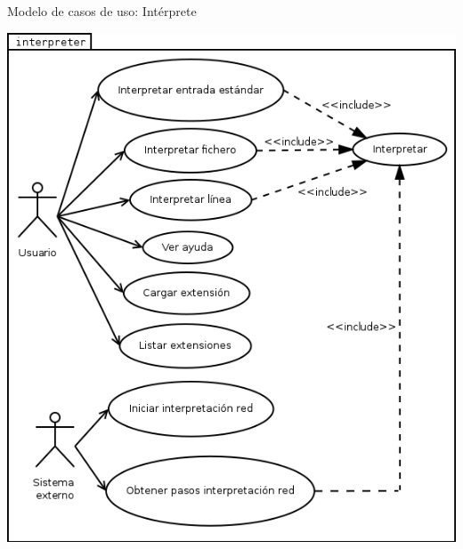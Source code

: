 \documentclass[spanish]{beamer}
\begin{document}
\begin{frame}{Modelo de casos de uso: Intérprete}
    \begin{center}
      \includegraphics[scale=0.3]{use_case_interpreter.png} 
      \end{center}
\end{frame}
\end{document}
